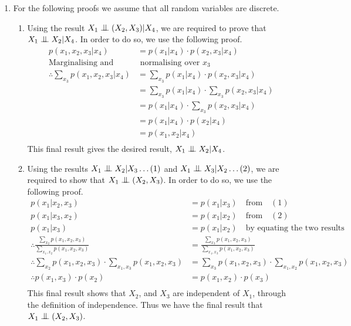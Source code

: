 \documentclass[a4paper]{article}
\newcommand{\indep}{\mathrel{\text{\scalebox{1.07}{$\perp\mkern-10mu\perp$}}}}
\begin{document}
\begin{enumerate}[label=\textbf{\arabic*.}]
	\item For the following proofs we assume that all random variables are discrete.
	\begin{enumerate}
		\item Using the result $\displaystyle{X_1 \indep (X_2,X_3) | X_4}$, we are required to prove that $\displaystyle{X_1 \indep X_2 | X_4}$. In order to do so, we use the following proof.
		\begin{align*}
		p(x_1,x_2,x_3|x_4) & = p(x_1|x_4)\cdot p(x_2,x_3|x_4)\\
		\text{Marginalising and} & \text{ normalising over $\displaystyle{x_3}$}\\
		\therefore \sum_{x_3} p(x_1,x_2,x_3|x_4) & = \sum_{x_3} p(x_1|x_4)\cdot p(x_2,x_3|x_4)\\
		& = \sum_{x_3} p(x_1|x_4)\cdot \sum_{x_3} p(x_2,x_3|x_4)\\
		& = p(x_1|x_4)\cdot \sum_{x_3} p(x_2,x_3|x_4)\\
		& = p(x_1|x_4)\cdot p(x_2|x_4)\\
		& = p(x_1,x_2|x_4)\\
		\end{align*}
		This final result gives the desired result, $\displaystyle{X_1 \indep X_2 | X_4}$.

		\item Using the results $\displaystyle{X_1 \indep X_2 | X_3 \dots (1)}$ and $\displaystyle{X_1 \indep X_3 | X_2 \dots (2)}$, we are required to show that $\displaystyle{X_1 \indep (X_2,X_3)}$. In order to do so, we use the following proof.
		\begin{align*}
		p(x_1|x_2,x_3) & = p(x_1|x_3) \quad \text{from} \quad (1) \\
		p(x_1|x_3,x_2) & = p(x_1|x_2) \quad \text{from} \quad (2) \\
		p(x_1|x_3) & = p(x_1|x_2) \quad \text{by equating the two results} \\
		\therefore \frac{\sum_{x_2} p(x_1,x_2,x_3)}{\sum_{x_1,x_2} p(x_1,x_2,x_3)} & = \frac{\sum_{x_3} p(x_1,x_2,x_3)}{\sum_{x_1,x_3} p(x_1,x_2,x_3)} \\
		\therefore \sum_{x_2} p(x_1,x_2,x_3) \cdot \sum_{x_1,x_3} p(x_1,x_2,x_3) & = \sum_{x_3} p(x_1,x_2,x_3) \cdot \sum_{x_1,x_2} p(x_1,x_2,x_3) \\
		\therefore p(x_1,x_3) \cdot p(x_2) & = p(x_1,x_2) \cdot p(x_3) \\
		\end{align*}
		This final result shows that $\displaystyle{X_2}$, and $\displaystyle{X_3}$ are independent of $\displaystyle{X_1}$, through the definition of independence. Thus we have the final result that $\displaystyle{X_1 \indep (X_2,X_3)}$.



\end{enumerate}
\end{enumerate}
\end{document}
